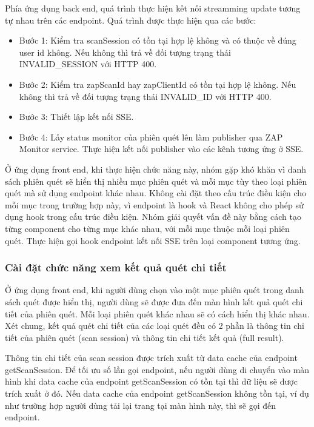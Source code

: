 Phía ứng dụng back end, quá trình thực hiện kết nối streamming update tương tự nhau trên các endpoint. Quá trình được thực hiện qua các bước:

\begin{itemize}
  \item Bước 1: Kiểm tra scanSession có tồn tại hợp lệ không và có thuộc về đúng user id không. Nếu không thì trả về đối tượng trạng thái INVALID\_SESSION với HTTP 400.
  \item Bước 2: Kiểm tra zapScanId hay zapClientId có tồn tại hợp lệ không. Nếu không thì trả về đối tượng trạng thái INVALID\_ID với HTTP 400.
  \item Bước 3: Thiết lập kết nối SSE.
  \item Bước 4: Lấy status monitor của phiên quét lên làm publisher qua ZAP Monitor service. Thực hiện kết nối publisher vào các kênh tương ứng ở SSE.
\end{itemize}

Ở ứng dụng front end, khi thực hiện chức năng này, nhóm gặp khó khăn vì danh sách phiên quét sẽ hiển thị nhiều mục phiên quét và mỗi mục tùy theo loại phiên quét mà sử dụng endpoint khác nhau. Không cài đặt theo cấu trúc điều kiện cho mỗi mục trong trường hợp này, vì endpoint là hook và React không cho phép sử dụng hook trong cấu trúc điều kiện. Nhóm giải quyết vấn đề này bằng cách tạo từng component cho từng mục khác nhau, với mỗi mục thuộc mỗi loại phiên quét. Thực hiện gọi hook endpoint kết nối SSE trên loại component tương ứng.

\subsubsection{Cài đặt chức năng xem kết quả quét chi tiết} \label{subsubsec:CaiDatChucNangXemKetQuaQuetChiTiet}

\tab Ở ứng dụng front end, khi người dùng chọn vào một mục phiên quét trong danh sách quét được hiển thị, người dùng sẽ được đưa đến màn hình kết quả quét chi tiết của phiên quét.
Mỗi loại phiên quét khác nhau sẽ có cách hiển thị khác nhau.
Xét chung, kết quả quét chi tiết của các loại quét đều có 2 phần là thông tin chi tiết của phiên quét (scan session) và thông tin chi tiết kết quả (full result).

Thông tin chi tiết của scan session được trích xuất từ data cache của endpoint getScanSession.
Để tối ưu số lần gọi endpoint, nếu người dùng di chuyển vào màn hình khi data cache của endpoint getScanSession có tồn tại thì dữ liệu sẽ được trích xuất ở đó.
Nếu data cache của endpoint getScanSession không tồn tại, ví dụ như trường hợp người dùng tải lại trang tại màn hình này, thì sẽ gọi đến endpoint.

